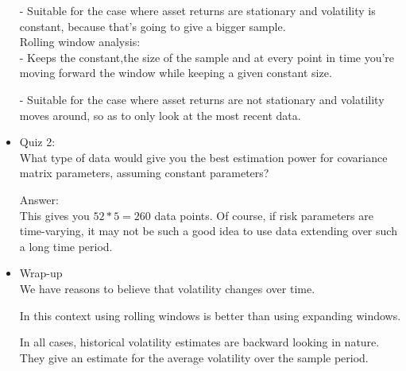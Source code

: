 \documentclass{maths}
\begin{document}
\begin{itemize}
- Suitable for the case where asset returns are stationary and volatility is constant,
because that's going to give a bigger sample. \\

Rolling window analysis:\\
- Keeps the constant,the size of the sample and at every point in time you're moving
forward the window while keeping a given constant size. 

- Suitable for the case where asset returns are not stationary and volatility moves around, so as to only look at the most recent data.\\ 


\item Quiz 2:\\
What type of data would give you the best estimation power for covariance matrix parameters, assuming constant parameters?

Answer:\\
 This gives you $52*5=260$ data points. Of course, if risk parameters are time-varying, it may not be such a good idea to use data extending over such a long time period.\\
  
\item Wrap-up\\

We have reasons to believe that volatility changes over time.

In this context using rolling windows is better than using expanding windows.

In all cases, historical volatility estimates are backward looking in nature. They give an estimate for the average volatility over the sample period.

\end{itemize}
\end{document}
